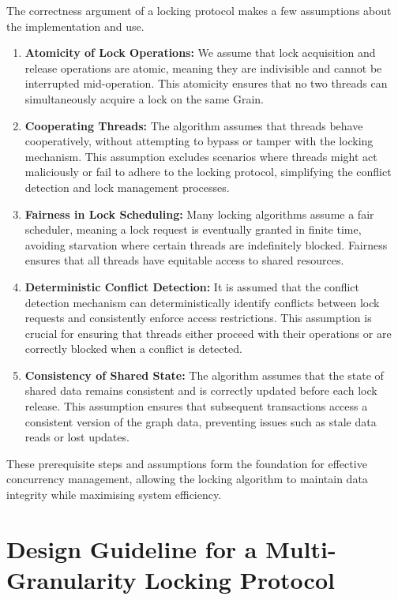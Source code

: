 The correctness argument of a locking protocol makes a few assumptions about the implementation and use.

\begin{enumerate}
    \item \textbf{Atomicity of Lock Operations:} We assume that lock acquisition and release operations are atomic, meaning they are indivisible and cannot be interrupted mid-operation. This atomicity ensures that no two threads can simultaneously acquire a lock on the same Grain.

    \item \textbf{Cooperating Threads:} The algorithm assumes that threads behave cooperatively, without attempting to bypass or tamper with the locking mechanism. This assumption excludes scenarios where threads might act maliciously or fail to adhere to the locking protocol, simplifying the conflict detection and lock management processes.
    
    \item  \textbf{Fairness in Lock Scheduling:} Many locking algorithms assume a fair scheduler, meaning a lock request is eventually granted in finite time, avoiding starvation where certain threads are indefinitely blocked. Fairness ensures that all threads have equitable access to shared resources.

    \item \textbf{Deterministic Conflict Detection:}  It is assumed that the conflict detection mechanism can deterministically identify conflicts between lock requests and consistently enforce access restrictions. This assumption is crucial for ensuring that threads either proceed with their operations or are correctly blocked when a conflict is detected.
    
    \item \textbf{Consistency of Shared State:} The algorithm assumes that the state of shared data remains consistent and is correctly updated before each lock release. This assumption ensures that subsequent transactions access a consistent version of the graph data, preventing issues such as stale data reads or lost updates.
\end{enumerate}


These prerequisite steps and assumptions form the foundation for effective concurrency management, allowing the locking algorithm to maintain data integrity while maximising system efficiency.



\section{Design Guideline for a Multi-Granularity Locking Protocol} \label{sec:requirements}

